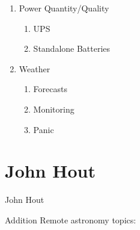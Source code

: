 \documentclass[letter,11pt,oneside]{article}
\begin{document}
\begin{enumerate}
   \item   Power Quantity/Quality
\vspace{-.15cm}
\begin{enumerate}\addtolength{\itemsep}{-0.5\baselineskip}
   \item   UPS
   \item   Standalone Batteries
\end{enumerate}

   \item   Weather
\vspace{-.15cm}
\begin{enumerate}\addtolength{\itemsep}{-0.5\baselineskip}
   \item   Forecasts
   \item   Monitoring
   \item   Panic
\end{enumerate}
\end{enumerate}

\section{John Hout}

John Hout

Addition Remote astronomy topics:
\end{document}
